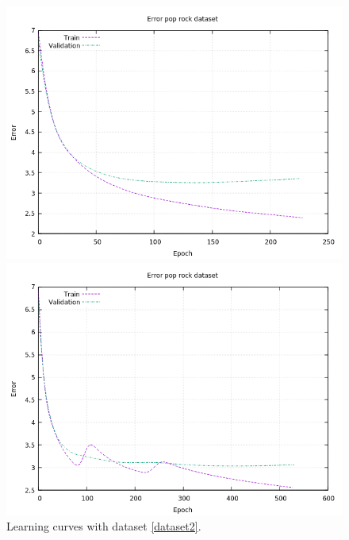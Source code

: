 \begin{figure}[H]
	\centering
	\begin{minipage}[t]{0.5\linewidth}
		\includegraphics[width=\linewidth]{img/Plot/pop_rock/plot_pop_rock_64_0_drop.png}
	\end{minipage}%
	\begin{minipage}[t]{0.5\linewidth}
		\includegraphics[width=\linewidth]{img/Plot/pop_rock/plot_pop_rock_64_0.1_drop.png}
	\end{minipage}
	\caption{Learning curves with dataset \ref{dataset2}.}
	\label{fig:d2}
\end{figure}
